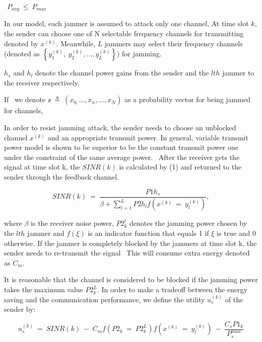 \documentclass[letterpaper%
, oneside%
, 12pt%
,thesepararticles%
, english%
,creativecommons,hyperref, withAlgo2e%
]{thETS}
\begin{document}
$\displaystyle \ \ P_{avg} \ \leq \ P_{max}$ 



In our model, each jammer is assumed to attack only one channel, At time slot $\displaystyle k,$the sender can choose one of N selectable frequency channels for transmitting denoted by $\displaystyle x^{( k)} .$ Meanwhile, $\displaystyle L$ jammers may select their frequency channels (denoted as $\displaystyle \left\{y_{1}^{( k)} ,\ y_{2}^{( k)} ,\dotsc ,y_{L}^{( k)}\right\}$) for jamming. 
  
 $\displaystyle h_{s}$ and $\displaystyle h_{l}$ denote the channel power gains from the sender and the $\displaystyle lth$ jammer to the receiver respectively. 

If \ we denote $\displaystyle \mathbb{x} \ \triangleq \ ( x_{0,} \dotsc ,x_{n} ,\dotsc ,x_{N})$ as a probability vector for being jammed for channels,


In order to resist jamming attack, the sender needs to choose an unblocked channel $\displaystyle x^{( k)}$ and an appropriate transmit power. In general, variable transmit power model is shown to be superior to be the constant transmit power one under the constraint of the same average power. \ After the receiver gets the signal at time slot k, the $\displaystyle SINR( k)$ is calculated by (1) and returned to the sender through the feedback channel. 
 
\begin{equation}
SINR( k) \ =\ \frac{P1h_{s}}{\beta +\sum _{l=1}^{L} P2h_{l} f\left( x^{( k)} \ =\ y_{l}^{( k)}\right)} ,
\end{equation}
 
 where $\displaystyle \beta $ is the receiver noise power, $\displaystyle P2_{k}^{l}$ denotes the jamming power chosen by the $\displaystyle lth$ jammer and $\displaystyle f( \xi )$ is an indicator function that equals 1 if $\displaystyle \xi $ is true and 0 otherwise. If the jammer is completely blocked by the jammers at time slot k, the sender needs to re-transmit the signal \ This will consume extra energy denoted as $\displaystyle C_{m} .$

It is reasonable that the channel is considered to be blocked if the jamming power takes the maximum value $\displaystyle P2_{k}^{L} .$ In order to make a tradeoff between the energy saving and the communication performance, we define the utility $\displaystyle u_{s}^{( k)}$ of the sender by: 
 
\begin{equation}
u_{s}^{( k)} \ =\ SINR( k) \ -\ C_{m} f\left( P2_{k} \ =\ P2_{k}^{L}\right) f\left( x^{( k)} \ =\ y_{l}^{( k)}\right) \ -\ \frac{C_{s} P1_{k}}{P_{s}^{max}}
\end{equation}
\end{document}
